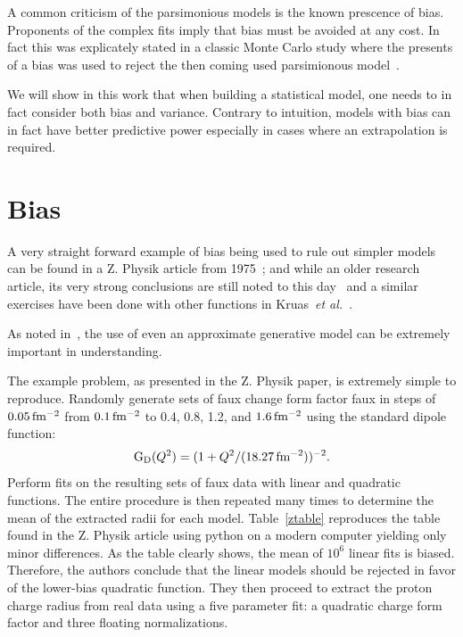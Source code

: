 \documentclass[10pt,aps,prc,twocolumn]{revtex4-1}
\begin{document}
A common criticism of the parsimonious models is the known prescence of bias. 
Proponents of the complex fits imply that bias must be avoided at any cost. 
In fact this was explicately stated in a classic Monte Carlo study where the 
presents of a bias was used to reject the then coming used parsimionous 
model~\cite{Borkowski:1975}.

We will show in this work that when building a statistical model, one needs to in fact 
consider both bias and variance.   Contrary to intuition, models with bias can in fact 
have better predictive power especially in cases where an extrapolation is required.

\section{Bias}

A very straight forward example of bias being used to rule out simpler models can be found in a Z. Physik
article from 1975~\cite{Borkowski:1975}; and while an older research article, its very strong conclusions are still 
noted to this day~\cite{Sick:2017aor} and a similar exercises have been done with other functions 
in Kruas~\textit{et al.}~\cite{Kraus:2014qua}.

As noted in~\cite{Hogg:2010yz}, the use of even an approximate generative model can be extremely important in understanding. 

The example problem, as presented in the Z. Physik paper, is extremely simple to reproduce.   
Randomly generate sets of faux change form factor faux in steps of $\unit[0.05]{fm^{-2}}$ from $\unit[0.1]{fm^{-2}}$ to 0.4, 0.8, 1.2,
and $\unit[1.6]{fm^{-2}}$ using the standard dipole function:
\begin{equation}
\label{sd}
\mathrm{G_D}(Q^2) = ( 1 + Q^2/(\unit[18.27]{fm^{-2}}))^{-2}.
\end{equation}
Perform fits on the resulting sets of faux data with linear and quadratic functions. The entire procedure is
then repeated many times to determine the mean of the extracted radii for each model. Table~\ref{ztable} reproduces the table found in the
Z. Physik article using python on a modern computer yielding only minor differences.
As the table clearly shows, the mean of $10^6$ linear fits is biased. 
Therefore, the authors conclude that the linear models should be rejected in favor of the lower-bias quadratic function.
They then proceed to extract the proton charge radius from real data using a five parameter fit: a quadratic charge form factor and three floating normalizations.
\end{document}
